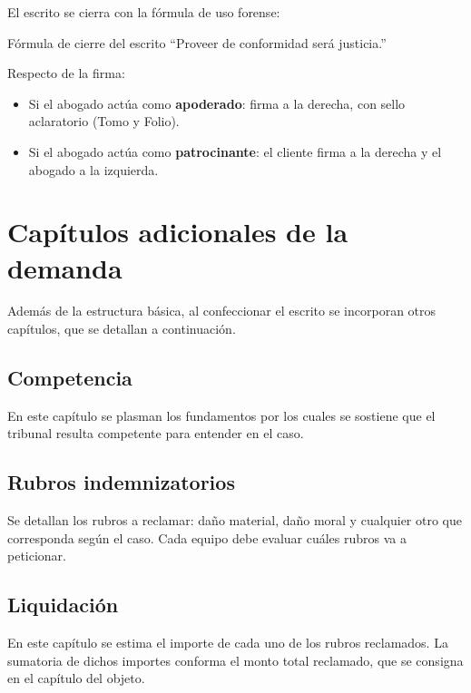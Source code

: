 \documentclass[12pt,oneside]{book}
\begin{document}
El escrito se cierra con la fórmula de uso forense:

\begin{example}{Fórmula de cierre del escrito}
``Proveer de conformidad será justicia.''
\end{example}

Respecto de la firma:
\begin{itemize}
    \item Si el abogado actúa como \textbf{apoderado}: firma a la derecha, con sello aclaratorio (Tomo y Folio).
    \item Si el abogado actúa como \textbf{patrocinante}: el cliente firma a la derecha y el abogado a la izquierda.
\end{itemize}

\chapter{Capítulos adicionales de la demanda}

Además de la estructura básica, al confeccionar el escrito se incorporan otros capítulos, que se detallan a continuación.

\section{Competencia}

En este capítulo se plasman los fundamentos por los cuales se sostiene que el tribunal resulta competente para entender en el caso.

\section{Rubros indemnizatorios}

Se detallan los rubros a reclamar: daño material, daño moral y cualquier otro que corresponda según el caso. Cada equipo debe evaluar cuáles rubros va a peticionar.

\section{Liquidación}

En este capítulo se estima el importe de cada uno de los rubros reclamados. La sumatoria de dichos importes conforma el monto total reclamado, que se consigna en el capítulo del objeto.
\end{document}

